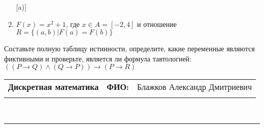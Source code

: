 \documentclass[10pt]{exam}
\newcommand{\class}{Дискретная математика}
\newcommand{\examdate}{}
\begin{document}
\begin{questions}
\begin{enumerate} [a)]
\item $F(x)=x^{2}+1$, где $x \in A = [-2, 4]$ и отношение $R = \{(a,b)|F(a) = F(b)\}$
\end{enumerate}\question Составьте полную таблицу истинности, определите, какие переменные являются фиктивными и проверьте, является ли формула тавтологией:
$(( P \rightarrow Q) \land (Q \rightarrow P)) \rightarrow (P \rightarrow R)$

\end{questions}
\newpage
\begin{flushright}
\begin{tabular}{p{2.8in} r l}
\textbf{\class} & \textbf{ФИО:} &Блажков Александр Дмитриевич
\\

\textbf{\examdate} &&\\
\end{tabular}\\
\end{flushright}
\rule[1ex]{\textwidth}{.1pt}
\end{document}
